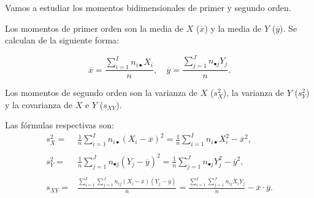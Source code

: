 \documentclass[12pt]{report}
\begin{document}
Vamos  a estudiar los momentos  bidimensionales de primer  y segundo orden.

Los momentos de primer orden son la media de $X$ ($\overline{x}$) y la media de $Y$
($\overline{y}$). Se calculan de la siguiente forma:

$$
\overline{x}=\frac{\sum\limits_{i=1}^{I}n_{i\bullet} X_i}{n},\quad
\overline{y}=\frac{\sum\limits_{j=1}^{J}n_{\bullet j} Y_j}{n}.
$$

Los  momentos de segundo orden son la varianza de $X$ ($s_X^2$), la varianza de $Y$
($s_Y^2$) y la covarianza de $X$  e $Y$ ($s_{XY}$).

Las fórmulas respectivas son:
\
$$
\begin{array}{rl}
s_X^2= & \frac{1}{n}\sum\limits_{i=1}^I n_{i\bullet}\left(X_i-\overline{x}\right)^2 =
\frac{1}{n}\sum\limits_{i=1}^I n_{i\bullet}X_i^2 -\overline{x}^2, \\ & \\ s_Y^2= &
\frac{1}{n}\sum\limits_{j=1}^J n_{\bullet j}\left(Y_j-\overline{y}\right)^2 =
\frac{1}{n}\sum\limits_{j=1}^J n_{\bullet j}Y_j^2 -\overline{y}^2, \\ & \\ s_{XY}= &
\frac{\sum\limits_{i=1}^I\sum\limits_{j=1}^J
   n_{ij}\left(X_i-\overline{x}\right)\left(Y_j-\overline{y}\right)}{n}=
   \frac{\sum\limits_{i=1}^I\sum\limits_{j=1}^J
   n_{ij}X_i Y_j}{n} -\overline{x}\cdot\overline{y}.
\end{array}
$$
\end{document}
